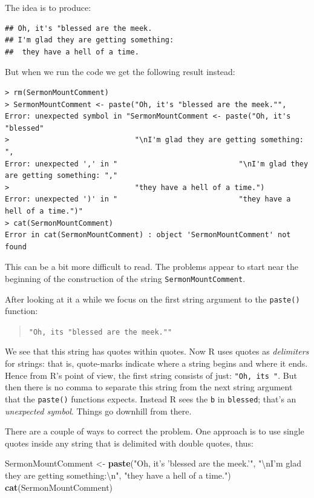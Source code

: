 \documentclass[]{book}
\makeatletter
\newenvironment{Shaded}{\begin{snugshade}}{\end{snugshade}}
\newcommand{\KeywordTok}[1]{\textcolor[rgb]{0.13,0.29,0.53}{\textbf{#1}}}
\newcommand{\CharTok}[1]{\textcolor[rgb]{0.31,0.60,0.02}{#1}}
\newcommand{\StringTok}[1]{\textcolor[rgb]{0.31,0.60,0.02}{#1}}
\newcommand{\NormalTok}[1]{#1}
\newenvironment{kframe}{%
\medskip{}
\setlength{\fboxsep}{.8em}
 \def\at@end@of@kframe{}%
 \ifinner\ifhmode%
  \def\at@end@of@kframe{\end{minipage}}%
  \begin{minipage}{\columnwidth}%
 \fi\fi%
 \def\FrameCommand##1{\hskip\@totalleftmargin \hskip-\fboxsep
 \colorbox{shadecolor}{##1}\hskip-\fboxsep
     \hskip-\linewidth \hskip-\@totalleftmargin \hskip\columnwidth}%
 \MakeFramed {\advance\hsize-\width
   \@totalleftmargin\z@ \linewidth\hsize
   \@setminipage}}%
 {\par\unskip\endMakeFramed%
 \at@end@of@kframe}
\renewenvironment{Shaded}{\begin{kframe}}{\end{kframe}}
\theoremstyle{definition}
\theoremstyle{definition}
\theoremstyle{definition}
\theoremstyle{remark}
\makeatother
\begin{document}
The idea is to produce:

\begin{verbatim}
## Oh, it's "blessed are the meek.
## I'm glad they are getting something:
##  they have a hell of a time.
\end{verbatim}

But when we run the code we get the following result instead:

\begin{verbatim}
> rm(SermonMountComment)
> SermonMountComment <- paste("Oh, it's "blessed are the meek."",
Error: unexpected symbol in "SermonMountComment <- paste("Oh, it's "blessed"
>                             "\nI'm glad they are getting something: ",
Error: unexpected ',' in "                            "\nI'm glad they are getting something: ","
>                             "they have a hell of a time.")
Error: unexpected ')' in "                            "they have a hell of a time.")"
> cat(SermonMountComment)
Error in cat(SermonMountComment) : object 'SermonMountComment' not found
\end{verbatim}

This can be a bit more difficult to read. The problems appear to start
near the beginning of the construction of the string
\texttt{SermonMountComment}.

After looking at it a while we focus on the first string argument to the
\texttt{paste()} function:

\begin{quote}
\texttt{"Oh,\ it\textquotesingle{}s\ "blessed\ are\ the\ meek.""}
\end{quote}

We see that this string has quotes within quotes. Now R uses quotes as
\emph{delimiters}  for strings: that is, quote-marks
indicate where a string begins and where it ends. Hence from R's point
of view, the first string consists of just:
\texttt{"Oh,\ it\textquotesingle{}s\ "}. But then there is no comma to
separate this string from the next string argument that the
\texttt{paste()} functions expects. Instead R sees the \texttt{b} in
\texttt{blessed}; that's an \emph{unexpected symbol}. Things go downhill
from there.

There are a couple of ways to correct the problem. One approach is to
use single quotes inside any string that is delimited with double
quotes, thus:

\begin{Shaded}
\begin{Highlighting}[]
\NormalTok{SermonMountComment <-}\StringTok{ }\KeywordTok{paste}\NormalTok{(}\StringTok{"Oh, it's 'blessed are the meek.'"}\NormalTok{,}
                     \StringTok{"}\CharTok{\textbackslash{}n}\StringTok{I'm glad they are getting something:}\CharTok{\textbackslash{}n}\StringTok{"}\NormalTok{,}
                     \StringTok{"they have a hell of a time."}\NormalTok{)}
\KeywordTok{cat}\NormalTok{(SermonMountComment)}
\end{Highlighting}
\end{Shaded}
\end{document}
